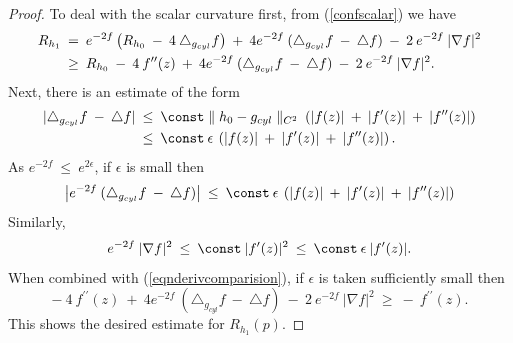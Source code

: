 \begin{proof}
To deal with the scalar curvature first, from (\ref{confscalar}) we have
\begin{align}
R_{h_1} \: & = \: e^{-2f} \left( R_{h_0} \: - \: 4 \: \triangle_{g_{cyl}} f \right) \: + \:
4 e^{-2f}  \: (\triangle_{g_{cyl}} f \: - \: \triangle f) \:- \: 2 \: e^{-2f} \: |\nabla f|^2 \\
& \ge \: R_{h_0} \: - \: 4 \: f^{\prime \prime}(z)  \: + \:
4 e^{-2f}  \: (\triangle_{g_{cyl}} f \: - \: \triangle f) \:- \: 2 \: e^{-2f} \: |\nabla f|^2. \notag
\end{align}
Next, there is an estimate of the form
\begin{align}
|\triangle_{g_{cyl}} f \: - \: \triangle f| \: & \le \: \const \parallel h_0 - g_{cyl}
\parallel_{C^2} \: \left( |f(z)| \: + \: |f^\prime(z)| \: + \:
|f^{\prime \prime}(z)| \right) \\
& \le \:
\const \: \epsilon \: \left( |f(z)| \: + \: |f^\prime(z)| \: + \:
|f^{\prime \prime}(z)| \right). \notag
\end{align}
As $e^{-2f} \: \le \: e^{2 \epsilon}$, if $\epsilon$ is small then
\begin{equation}
\left| e^{-2f}  \: (\triangle_{g_{cyl}} f \: - \: \triangle f) \right| \: \le \: \const \:
\epsilon \: \left( |f(z)| \: + \: |f^\prime(z)| \: + \:
|f^{\prime \prime}(z)| \right)
\end{equation}
Similarly,
\begin{equation}
e^{-2f} \: |\nabla f|^2 \: \le \: \const  \:
|f^\prime(z)|^2 \: \le \: \const \: \epsilon \: |f^\prime(z)|.
\end{equation}
When combined with (\ref{eqnderivcomparision}), if $\epsilon$ is taken
sufficiently small
then
\begin{equation}
- \: 4 \: f^{\prime \prime}(z)  \: + \:
4 e^{-2f}  \: (\triangle_{g_{cyl}} f \: - \: \triangle f) \:- \: 2 \: e^{-2f} \: |\nabla f|^2
\: \ge \: - \: f^{\prime \prime}(z).
\end{equation}
This shows the desired estimate for $R_{h_1}(p)$.


\end{proof}
